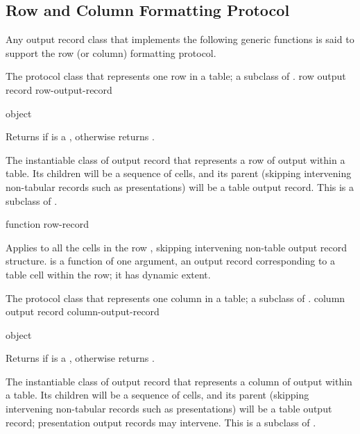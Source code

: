 \subsection {Row and Column Formatting Protocol}

Any output record class that implements the following generic functions is said
to support the row (or column) formatting protocol.


The protocol class that represents one row in a table; a subclass of
.
 {row output record} {row-output-record}

 {object}

Returns  if  is a , otherwise
returns .


The instantiable class of output record that represents a row of output within a
table.  Its children will be a sequence of cells, and its parent (skipping
intervening non-tabular records such as presentations) will be a table output
record.  This is a subclass of .

 {function row-record}

Applies  to all the cells in the row , skipping
intervening non-table output record structure.   is a function of
one argument, an output record corresponding to a table cell within the row; it
has dynamic extent.



The protocol class that represents one column in a table; a subclass of
.
 {column output record} {column-output-record}

 {object}

Returns  if  is a , otherwise
returns .


The instantiable class of output record that represents a column of output within
a table.  Its children will be a sequence of cells, and its parent (skipping
intervening non-tabular records such as presentations) will be a table output
record; presentation output records may intervene.  This is a subclass of
.


